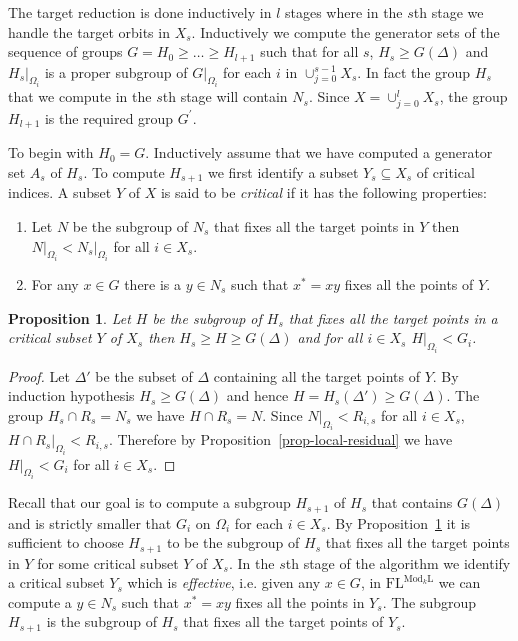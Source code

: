 \documentclass[11pt]{madras}%
\newtheorem{proposition}[theorem]{Proposition}
\theoremstyle{remark}
\newcommand{\ModkL}[1]{{\ensuremath{\mathrm{Mod}_{#1}\mathrm{L}}}}
\newcommand{\pr}[2]{{\ensuremath{\left.{#1}\right\vert_{#2}}}}
\newcommand{\pointwise}[2]{{\ensuremath{#1\left(#2\right)}}}
\begin{document}
The target reduction is done inductively in $l$ stages where in the
$s$th stage we handle the target orbits in $X_s$. Inductively we
compute the generator sets of the sequence of groups $G = H_0 \geq
\ldots \geq H_{l+1}$ such that for all $s$, $H_s \geq
\pointwise{G}{\Delta}$ and $\pr{H_s}{\Omega_i}$ is a proper subgroup
of $\pr{G}{\Omega_i}$ for each $i$ in $\cup_{j=0}^{s-1}X_s$. In fact
the group $H_s$ that we compute in the $s$th stage will contain $N_s$.
Since $X = \cup_{j = 0}^l X_s$, the group $H_{l+1}$ is the required
group $G^\prime$.

To begin with $H_0 = G$. Inductively assume that we have computed a
generator set $A_s$ of $H_s$.  To compute $H_{s+1}$ we first identify
a subset $Y_s \subseteq X_s$ of critical indices. A subset $Y$ of $X$
is said to be \emph{critical} if it has the following properties:

\begin{enumerate}
\item Let $N$ be the subgroup of $N_s$ that fixes all the target
  points in $Y$ then $\pr{N}{\Omega_i} < \pr{N_s}{\Omega_i}$ for all
  $i \in X_s$.
\item For any $x \in G$ there is a $y \in N_s$ such that $x^* = xy$
  fixes all the points of $Y$.
\end{enumerate}

\begin{proposition}\label{prop-critical}
  Let $H$ be the subgroup of $H_s$ that fixes all the target points in
  a critical subset $Y$ of $X_s$ then $H_s \geq H \geq
  \pointwise{G}{\Delta}$ and for all $i \in X_s$ $\pr{H}{\Omega_i} <
  G_i$.
\end{proposition}
\begin{proof}
  Let $\Delta'$ be the subset of $\Delta$ containing all the target
  points of $Y$. By induction hypothesis $H_s \geq
  \pointwise{G}{\Delta}$ and hence $H = \pointwise{H_s}{\Delta'} \geq
  \pointwise{G}{\Delta}$. The group $H_s \cap R_s = N_s$ we have $H
  \cap R_s = N$. Since $\pr{N}{\Omega_i} < R_{i,s}$ for all $i \in
  X_s$, $\pr{H \cap R_s}{\Omega_i} < R_{i,s}$.  Therefore by
  Proposition~\ref{prop-local-residual} we have $\pr{H}{\Omega_i} <
  G_i$ for all $i \in X_s$.
\end{proof}

Recall that our goal is to compute a subgroup $H_{s+1}$ of $H_s$ that
contains $\pointwise{G}{\Delta}$ and is strictly smaller that $G_i$ on
$\Omega_i$ for each $i \in X_s$. By Proposition~\ref{prop-critical} it
is sufficient to choose $H_{s+1}$ to be the subgroup of $H_s$ that
fixes all the target points in $Y$ for some critical subset $Y$ of
$X_s$.  In the $s$th stage of the algorithm we identify a critical
subset $Y_s$ which is \emph{effective}, i.e. given any $x \in G$, in
$\mathrm{FL}^{\ModkL{k}}$ we can compute a $y \in N_s$ such that $x^*
= xy$ fixes all the points in $Y_s$.  The subgroup $H_{s+1}$ is the
subgroup of $H_s$ that fixes all the target points of $Y_s$.
\end{document}
